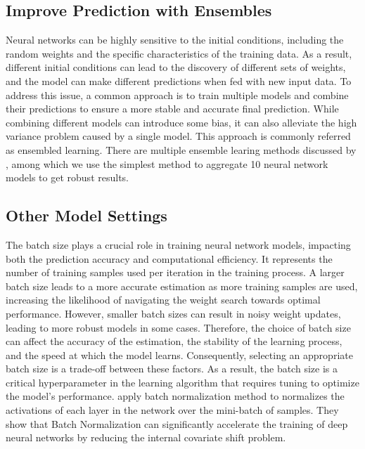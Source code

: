 \subsection{Improve Prediction with Ensembles}

Neural networks can be highly sensitive to the initial conditions, including the random weights and the specific characteristics of the training data. As a result, different initial conditions can lead to the discovery of different sets of weights, and the model can make different predictions when fed with new input data. To address this issue, a common approach is to train multiple models and combine their predictions to ensure a more stable and accurate final prediction. While combining different models can introduce some bias, it can also alleviate the high variance problem caused by a single model. This approach is commonly referred as ensembled learning. There are multiple ensemble learing methods discussed by \citet*{sagi2018ensemble}, among which we use the simplest method to aggregate 10 neural network models to get robust results.

\subsection{Other Model Settings}

The batch size plays a crucial role in training neural network models, impacting both the prediction accuracy and computational efficiency. It represents the number of training samples used per iteration in the training process. A larger batch size leads to a more accurate estimation as more training samples are used, increasing the likelihood of navigating the weight search towards optimal performance. However, smaller batch sizes can result in noisy weight updates, leading to more robust models in some cases. Therefore, the choice of batch size can affect the accuracy of the estimation, the stability of the learning process, and the speed at which the model learns. Consequently, selecting an appropriate batch size is a trade-off between these factors. As a result, the batch size is a critical hyperparameter in the learning algorithm that requires tuning to optimize the model's performance. \citet*{ioffe2015batch} apply batch normalization method to normalizes the activations of each layer in the network over the mini-batch of samples. They show that Batch Normalization can significantly accelerate the training of deep neural networks by reducing the internal covariate shift problem.

